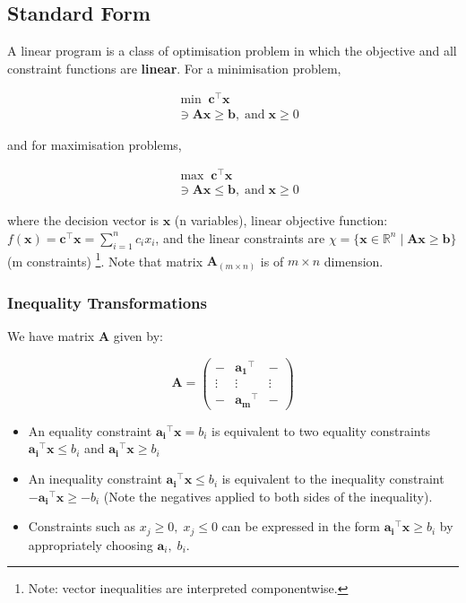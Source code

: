 \documentclass{article}
\begin{document}
\subsection{Standard Form}
A linear program is a class of optimisation problem in which the objective and all constraint functions are \textbf{linear}. For a minimisation problem,

\begin{align}
    & \min \; \mathbf{c}^{\top} \mathbf{x} \\ \nonumber
    & \ni \mathbf{Ax} \geq \mathbf{b}, \; \text{and} \; \mathbf{x} \geq 0
\end{align}

\noindent and for maximisation problems,

\begin{align}
    & \max \; \mathbf{c}^{\top} \mathbf{x} \\ \nonumber
    & \ni \mathbf{Ax} \leq \mathbf{b}, \; \text{and} \; \mathbf{x} \geq 0
\end{align}

\noindent where the decision vector is $\mathbf{x}$ (n variables), linear objective function: $f(\mathbf{x}) = \mathbf{c}^{\top} \mathbf{x} = \sum_{i=1}^{n} c_i x_i $, and the linear constraints are $\chi = \{\mathbf{x} \in \mathbb{R}^{n}\mid \mathbf{Ax} \geq \mathbf{b}\}$ (m constraints) \footnote{Note: vector inequalities are interpreted componentwise.}. Note that matrix $\mathbf{A}_{(m\times n)}$ is of $m \times n$ dimension. 

\subsubsection{Inequality Transformations}

We have matrix $\mathbf{A}$ given by:

\begin{equation*}
    \mathbf{A} = \begin{pmatrix}
        - & \mathbf{a_1}^{\top} & - \\ 
        \vdots & \vdots & \vdots \\ 
        - & \mathbf{a_m}^{\top} & -
    \end{pmatrix}
\end{equation*}

\begin{itemize}
    \item An equality constraint $\mathbf{a_i}^{\top} \mathbf{x} = b_i$ is equivalent to two equality constraints $\mathbf{a_i}^{\top} \mathbf{x} \leq b_i$ and $\mathbf{a_i}^{\top} \mathbf{x} \geq b_i$
    \item An inequality constraint $\mathbf{a_i}^{\top} \mathbf{x} \leq b_i$ is equivalent to the inequality constraint $-\mathbf{a_i}^{\top} \mathbf{x} \geq -b_i$ (Note the negatives applied to both sides of the inequality).
    \item Constraints such as $x_j \geq 0, \; x_j \leq 0$ can be expressed in the form $\mathbf{a_i}^{\top} \mathbf{x} \geq b_i$ by appropriately choosing $\mathbf{a}_i, \; b_i$.
\end{itemize}
\end{document}
